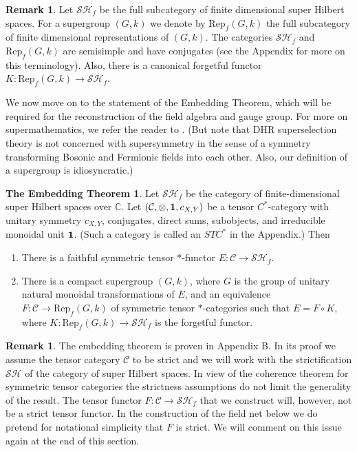 \documentclass[11pt]{article}
\newenvironment{bxd}%
  {\bigskip\noindent\begin{Sbox}\begin{minipage}{0.9\textwidth} }%
  {\end{minipage}\end{Sbox}\fbox{\TheSbox}\bigskip}%
\theoremstyle{definition}
\newtheorem*{emb}{The Embedding Theorem}
\theoremstyle{definition}
\newtheorem{note}[thm]{Remark}
\theoremstyle{remark}
\def\2#1{{\mathcal #1}}
\def\7#1{{\mathbb #1}}
\def\1#1{{\bf #1}}
\newcommand{\Rep}{\mathrm{Rep}}
\newcommand{\rarr}{\rightarrow}
\begin{document}
\begin{note} Let $\2S\2H_f$ be the full subcategory of
  finite dimensional super Hilbert spaces.  For a
  supergroup $(G,k)$ we denote by $\Rep _f(G,k)$ the
  full subcategory of finite dimensional
  representations of $(G,k)$.  The categories $\2S\2H
  _f$ and $\Rep _f(G,k)$ are semisimple and have
  conjugates (see the Appendix for more on this
  terminology).  Also, there is a canonical forgetful
  functor $K:\Rep _f(G,k)\to \2S\2H_f$.  \end{note}

We now move on to the statement of the Embedding
Theorem, which will be required for the reconstruction
of the field algebra and gauge group.  For more on
supermathematics, we refer the reader to
\cite{vara,super}.  (But note that DHR superselection
theory is not concerned with supersymmetry in the sense
of a symmetry transforming Bosonic and Fermionic fields
into each other.  Also, our definition of a supergroup
is idiosyncratic.)



\begin{bxd} \begin{emb} Let $\2S\2H_f$ be the category of
    finite-dimensional super Hilbert spaces over $\7C$.  Let $(\2C
    ,\otimes ,\11 ,c_{X,Y})$ be a tensor $C^*$-category with unitary
    symmetry $c_{X,Y}$, conjugates, direct sums, subobjects, and
    irreducible monoidal unit $\11$. (Such a category is called an
    $STC^*$ in the Appendix.)  Then
\begin{enumerate}
\item There is a faithful symmetric tensor $*$-functor $E:\2C\to \2S\2H_f$.
\item There is a compact supergroup $(G,k)$, where $G$ is the group of unitary
  natural monoidal transformations of $E$, and an equivalence $F:\2C \to \Rep
  _f(G,k)$ of symmetric tensor $*$-categories such that $E=F\circ K$, where $K:\Rep
  _f(G,k)\to \2S\2H_f$ is the forgetful functor.
\end{enumerate}
\end{emb}
\end{bxd}

\begin{note}
  The embedding theorem is proven in Appendix B.  In its proof we
  assume the tensor category $\2C$ to be strict and we will work with
  the strictification $\2S\2H$ of the category of super Hilbert
  spaces. In view of the coherence theorem for symmetric tensor
  categories the strictness assumptions do not limit the generality of
  the result. The tensor functor $F:\2C\rarr\2S\2H_f$ that we
  construct will, however, not be a strict tensor functor. In the
  construction of the field net below we do pretend for notational
  simplicity that $F$ is strict. We will comment on this issue again
  at the end of this section.
\end{note}
\end{document}
